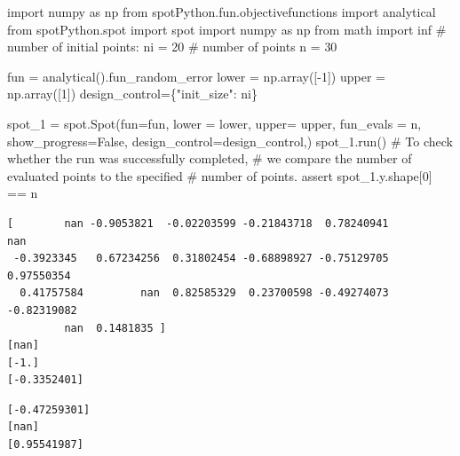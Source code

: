 \documentclass[
  letterpaper,
  DIV=11,
  numbers=noendperiod]{scrreprt}
\newenvironment{Shaded}{\begin{snugshade}}{\end{snugshade}}
\newcommand{\CommentTok}[1]{\textcolor[rgb]{0.37,0.37,0.37}{#1}}
\newcommand{\ControlFlowTok}[1]{\textcolor[rgb]{0.00,0.23,0.31}{#1}}
\newcommand{\DecValTok}[1]{\textcolor[rgb]{0.68,0.00,0.00}{#1}}
\newcommand{\ImportTok}[1]{\textcolor[rgb]{0.00,0.46,0.62}{#1}}
\newcommand{\NormalTok}[1]{\textcolor[rgb]{0.00,0.23,0.31}{#1}}
\newcommand{\OperatorTok}[1]{\textcolor[rgb]{0.37,0.37,0.37}{#1}}
\newcommand{\StringTok}[1]{\textcolor[rgb]{0.13,0.47,0.30}{#1}}
\newcommand{\VariableTok}[1]{\textcolor[rgb]{0.07,0.07,0.07}{#1}}
\begin{document}
\begin{Shaded}
\begin{Highlighting}[]
\ImportTok{import}\NormalTok{ numpy }\ImportTok{as}\NormalTok{ np}
\ImportTok{from}\NormalTok{ spotPython.fun.objectivefunctions }\ImportTok{import}\NormalTok{ analytical}
\ImportTok{from}\NormalTok{ spotPython.spot }\ImportTok{import}\NormalTok{ spot}
\ImportTok{import}\NormalTok{ numpy }\ImportTok{as}\NormalTok{ np}
\ImportTok{from}\NormalTok{ math }\ImportTok{import}\NormalTok{ inf}
\CommentTok{\# number of initial points:}
\NormalTok{ni }\OperatorTok{=} \DecValTok{20}
\CommentTok{\# number of points}
\NormalTok{n }\OperatorTok{=} \DecValTok{30}

\NormalTok{fun }\OperatorTok{=}\NormalTok{ analytical().fun\_random\_error}
\NormalTok{lower }\OperatorTok{=}\NormalTok{ np.array([}\OperatorTok{{-}}\DecValTok{1}\NormalTok{])}
\NormalTok{upper }\OperatorTok{=}\NormalTok{ np.array([}\DecValTok{1}\NormalTok{])}
\NormalTok{design\_control}\OperatorTok{=}\NormalTok{\{}\StringTok{"init\_size"}\NormalTok{: ni\}}

\NormalTok{spot\_1 }\OperatorTok{=}\NormalTok{ spot.Spot(fun}\OperatorTok{=}\NormalTok{fun,}
\NormalTok{            lower }\OperatorTok{=}\NormalTok{ lower,}
\NormalTok{            upper}\OperatorTok{=}\NormalTok{ upper,}
\NormalTok{            fun\_evals }\OperatorTok{=}\NormalTok{ n,}
\NormalTok{            show\_progress}\OperatorTok{=}\VariableTok{False}\NormalTok{,}
\NormalTok{            design\_control}\OperatorTok{=}\NormalTok{design\_control,)}
\NormalTok{spot\_1.run()}
\CommentTok{\# To check whether the run was successfully completed,}
\CommentTok{\# we compare the number of evaluated points to the specified}
\CommentTok{\# number of points.}
\ControlFlowTok{assert}\NormalTok{ spot\_1.y.shape[}\DecValTok{0}\NormalTok{] }\OperatorTok{==}\NormalTok{ n}
\end{Highlighting}
\end{Shaded}

\begin{verbatim}
[        nan -0.9053821  -0.02203599 -0.21843718  0.78240941         nan
 -0.3923345   0.67234256  0.31802454 -0.68898927 -0.75129705  0.97550354
  0.41757584         nan  0.82585329  0.23700598 -0.49274073 -0.82319082
         nan  0.1481835 ]
[nan]
[-1.]
[-0.3352401]
\end{verbatim}

\begin{verbatim}
[-0.47259301]
[nan]
[0.95541987]
\end{verbatim}
\end{document}
